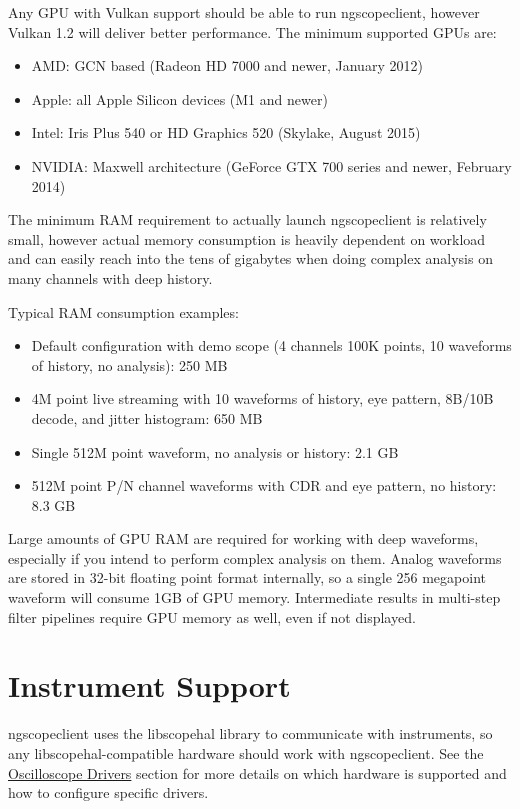 Any GPU with Vulkan support should be able to run ngscopeclient, however Vulkan 1.2 will deliver better performance.
The minimum supported GPUs are:
\begin{itemize}
\item AMD: GCN based (Radeon HD 7000 and newer, January 2012)
\item Apple: all Apple Silicon devices (M1 and newer)
\item Intel: Iris Plus 540 or HD Graphics 520 (Skylake, August 2015)
\item NVIDIA: Maxwell architecture (GeForce GTX 700 series and newer, February 2014)
\end{itemize}

The minimum RAM requirement to actually launch ngscopeclient is relatively small, however actual memory consumption is
heavily dependent on workload and can easily reach into the tens of gigabytes when doing complex analysis on many
channels with deep history.

Typical RAM consumption examples:
\begin{itemize}
\item Default configuration with demo scope (4 channels 100K points, 10 waveforms of history, no analysis): 250 MB
\item 4M point live streaming with 10 waveforms of history, eye pattern, 8B/10B decode, and jitter histogram: 650 MB
\item Single 512M point waveform, no analysis or history: 2.1 GB
\item 512M point P/N channel waveforms with CDR and eye pattern, no history: 8.3 GB
\end{itemize}

Large amounts of GPU RAM are required for working with deep waveforms, especially if you intend to perform
complex analysis on them. Analog waveforms are stored in 32-bit floating point format internally, so a single 256
megapoint waveform will consume 1GB of GPU memory. Intermediate results in multi-step filter pipelines require GPU
memory as well, even if not displayed.

\section{Instrument Support}

ngscopeclient uses the libscopehal library to communicate with instruments, so any libscopehal-compatible hardware
should work with ngscopeclient. See the \hyperref[sec:scope-drivers]{Oscilloscope Drivers} section for more details on
which hardware is supported and how to configure specific drivers.

